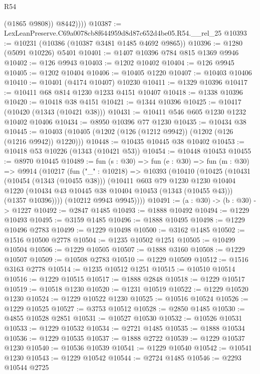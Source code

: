 \begin{lexlean}{R54}
\begin{coremodule}
              (@1865 @9808))
            @8442))))
@10387 := LexLeanPreserve.C69a0078cb8f644959d8d87c652d4be05.R54.__rel_25
@10393 := @10231 (@10386 (@10387 @3481 @1485 @4692 @9865))
@10396 := @1280 (@5091 @10226) @5401
@10401 := @1407 @10396 @784 @815 @1369 @9946
@10402 := @126 @9943
@10403 := @1202 @10402
@10404 := @126 @9945
@10405 := @1202 @10404
@10406 := @10405 @1220
@10407 := @10403 @10406
@10410 := @10401 (@4174 @10407) @10230
@10411 := @1329 @10396
@10417 := @10411 @68 @814 @1230 @1233 @4151 @10407
@10418 := @1338 @10396
@10420 := @10418 @38 @4151
@10421 := @1344 @10396
@10425 := @10417 (@10420 (@1343 (@10421 @38)))
@10431 := @10411 @546 @605 @1230 @1232 @10402 @10406
@10434 := @8950 @10396 @77 @1230
@10435 := @10434 @38
@10445 := @10403 (@10405 (@1202 (@126 (@1212 @9942)) (@1202 (@126 (@1216 @9942)) @1220)))
@10448 := @10435 @10445 @38 @10402
@10453 := @10418 @53 @10226 (@1343 (@10421 @53))
@10454 := @10448 @10453
@10455 := @8970 @10445
@10489 := fun (s : @30) =>
  fun (e : @30) =>
  fun (m : @30) =>
  @9914
    (@10217
      (fun ("_" : @10218) =>
      @10393
        (@10410
          (@10425
            (@10431
              (@10454 (@1343 (@10455 @38)))
              (@10411
                @603
                @79
                @1230
                @1230
                @10404
                @1220
                (@10434 @43 @10445 @38 @10404 @10453 (@1343 (@10455 @43)))
                (@1357 @10396))))
          (@10212 @9943 @9945))))
@10491 := (a : @30) -> (b : @30) -> @1227
@10492 := @2847 @1485
@10493 := @1888 @10492
@10494 := @1229 @10493
@10495 := @3159 @1485
@10496 := @1888 @10495
@10498 := @1229 @10496 @2783
@10499 := @1229 @10498
@10500 := @3162 @1485
@10502 := @1516 @10500 @2778
@10504 := @1235 @10502 @1251
@10505 := @10499 @10504
@10506 := @1229 @10505
@10507 := @1888 @3160
@10508 := @1229 @10507
@10509 := @10508 @2783
@10510 := @1229 @10509
@10512 := @1516 @3163 @2778
@10514 := @1235 @10512 @1251
@10515 := @10510 @10514
@10516 := @1229 @10515
@10517 := @1888 @2848
@10518 := @1229 @10517
@10519 := @10518 @1230
@10520 := @1231 @10519
@10522 := @1229 @10520 @1230
@10524 := @1229 @10522 @1230
@10525 := @10516 @10524
@10526 := @1229 @10525
@10527 := @3753 @10512
@10528 := @2850 @1485
@10530 := @4855 @10528 @2851
@10531 := @10527 @10530
@10532 := @10526 @10531
@10533 := @1229 @10532
@10534 := @2721 @1485
@10535 := @1888 @10534
@10536 := @1229 @10535
@10537 := @1888 @2722
@10539 := @1229 @10537 @1230
@10540 := @10536 @10539
@10541 := @1229 @10540
@10542 := @10541 @1230
@10543 := @1229 @10542
@10544 := @2724 @1485
@10546 := @2293 @10544 @2725

\end{coremodule}
\end{lexlean}
